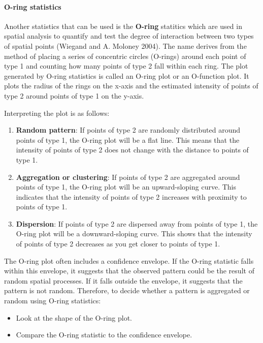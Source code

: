 \documentclass[
  letterpaper,
]{book}
\let\oldparagraph\paragraph
\renewcommand{\paragraph}[1]{\oldparagraph{#1}\mbox{}}
\begin{document}
\hypertarget{o-ring-statistics}{%
\paragraph{O-ring statistics}\label{o-ring-statistics}}

Another statistics that can be used is the \textbf{O-ring} statitics
which are used in spatial analysis to quantify and test the degree of
interaction between two types of spatial points (Wiegand and A. Moloney
2004). The name derives from the method of placing a series of
concentric circles (O-rings) around each point of type 1 and counting
how many points of type 2 fall within each ring. The plot generated by
O-ring statistics is called an O-ring plot or an O-function plot. It
plots the radius of the rings on the x-axis and the estimated intensity
of points of type 2 around points of type 1 on the y-axis.

Interpreting the plot is as follows:

\begin{enumerate}
\def\labelenumi{\arabic{enumi}.}
\item
  \textbf{Random pattern}: If points of type 2 are randomly distributed
  around points of type 1, the O-ring plot will be a flat line. This
  means that the intensity of points of type 2 does not change with the
  distance to points of type 1.
\item
  \textbf{Aggregation or clustering}: If points of type 2 are aggregated
  around points of type 1, the O-ring plot will be an upward-sloping
  curve. This indicates that the intensity of points of type 2 increases
  with proximity to points of type 1.
\item
  \textbf{Dispersion}: If points of type 2 are dispersed away from
  points of type 1, the O-ring plot will be a downward-sloping curve.
  This shows that the intensity of points of type 2 decreases as you get
  closer to points of type 1.
\end{enumerate}

The O-ring plot often includes a confidence envelope. If the O-ring
statistic falls within this envelope, it suggests that the observed
pattern could be the result of random spatial processes. If it falls
outside the envelope, it suggests that the pattern is not random.
Therefore, to decide whether a pattern is aggregated or random using
O-ring statistics:

\begin{itemize}
\item
  Look at the shape of the O-ring plot.
\item
  Compare the O-ring statistic to the confidence envelope.
\end{itemize}
\end{document}
